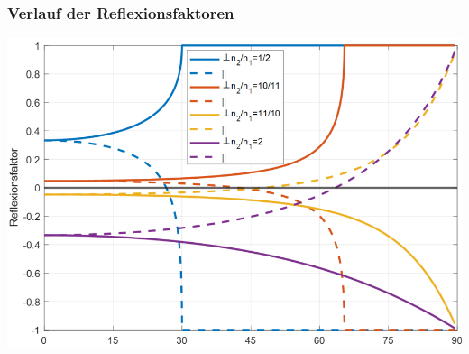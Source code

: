 \subsubsection{Verlauf der Reflexionsfaktoren}
\includegraphics[width=\columnwidth]{Figures/Verlauf_Reflexionsfaktoren.png}

\newpage


